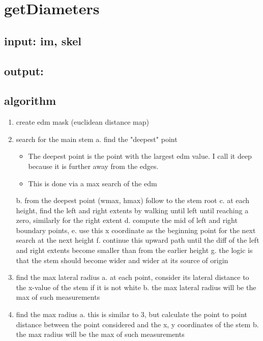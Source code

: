 \documentclass[11pt]{article}
\author{adam}
\date{\today}
\title{}
\begin{document}
\tableofcontents


\section{getDiameters}
\label{sec:org5c48abe}
\subsection{input: im, skel}
\label{sec:orgbe4c976}
\subsection{output:}
\label{sec:orga343b54}
\subsection{algorithm}
\label{sec:org6658d2f}
\begin{enumerate}
\item create edm mask (euclidean distance map)
\item search for the main stem
a. find the "deepest" point
\begin{itemize}
\item The deepest point is the point with the largest edm value.  I
call it deep because it is further away from the edges.
\item This is done via a max search of the edm
\end{itemize}
b. from the deepest point (wmax, hmax) follow to the stem root
c. at each height, find the left and right extents by walking until
   left until reaching a zero, similarly for the right extent
d. compute the mid of left and right boundary points,
e. use this x coordinate as the beginning point for the next search
   at the next height
f. continue this upward path until the diff of the left and right
   extents become smaller than from the earlier height
g. the logic is that the stem should become wider and wider at its
   source of origin
\item find the max lateral radius
a. at each point, consider its lateral distance to the x-value of
   the stem if it is not white
b. the max lateral radius will be the max of such measurements
\item find the max radius
a. this is similar to 3, but calculate the point to point distance
   between the point considered and the x, y coordinates of the
   stem
b. the max radius will be the max of such measurements
\end{enumerate}
\end{document}
